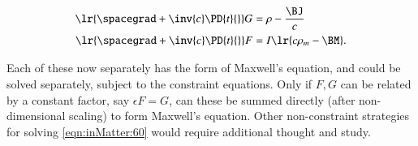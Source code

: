 \begin{dmath}\label{eqn:inMatter:220}
\begin{aligned}
\lr{ \spacegrad + \inv{c} \PD{t}{} } G &= \rho - \frac{\BJ}{c} \\
\lr{ \spacegrad + \inv{c} \PD{t}{} } F &= I \lr{ c \rho_m - \BM }.
\end{aligned}
\end{dmath}

Each of these now separately has the form of Maxwell's equation, and could be solved separately, subject to the constraint equations.
Only if \( F, G \) can be related by a constant factor, say \( \epsilon F = G \), can these be summed directly (after non-dimensional scaling) to form Maxwell's equation.
Other non-constraint strategies for solving \cref{eqn:inMatter:60} would require additional thought and study.
